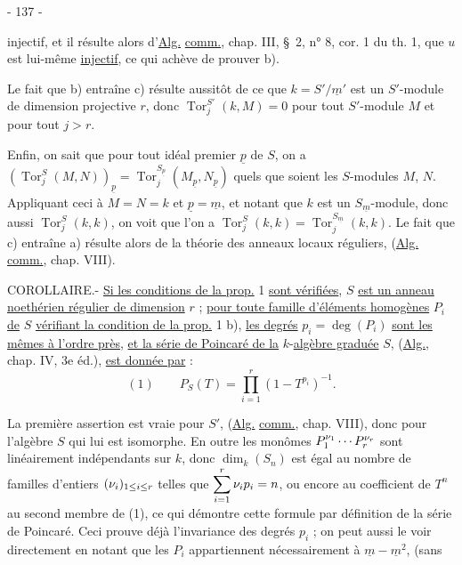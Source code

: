 \begin{center}- 137 -\end{center}

injectif, et il résulte alors d'\uline{Alg.} \uline{comm.}, chap. III, \S\ 2, n° 8, cor. 1 du th. 1, que $u$ est lui-même \uline{injectif}, ce qui achève de prouver b).

Le fait que b) entraîne c) résulte aussitôt de ce que $k=S'/\underline m'$ est un $S'$-module de dimension projective $r$, donc $\operatorname{Tor}^{S'}_j(k,M)=0$ pour tout $S'$-module $M$ et pour tout $j>r$.

Enfin, on sait que pour tout idéal premier $\underline p$ de $S$, on a $(\operatorname{Tor}^S_j(M,N))_{\underline p}=\operatorname{Tor}^{S_{\underline p}}_j(M_{\underline p},N_{\underline p})$ quels que soient les $S$-modules $M$, $N$. Appliquant ceci à $M=N=k$ et $\underline p=\underline m$, et notant que $k$ est un $S_{\underline m}$-module, donc aussi $\operatorname{Tor}^S_j(k,k)$, on voit que l'on a $\operatorname{Tor}^S_j(k,k)=\operatorname{Tor}^{S_{\underline m}}_j(k,k)$. Le fait que c) entraîne a) résulte alors de la théorie des anneaux locaux réguliers, (\uline{Alg.} \uline{comm.}, chap. VIII).

COROLLAIRE.- \uline{Si les conditions de la prop.} 1 \uline{sont vérifiées}, $S$ \uline{est un anneau noethérien régulier de dimension} $r$ ; \uline{pour toute famille d'éléments homogènes} $P_i$ \uline{de} $S$ \uline{vérifiant la condition de la prop.} 1 b), \uline{les degrés} $p_i=\deg(P_i)$ \uline{sont les mêmes à l'ordre près}, \uline{et la série de Poincaré de la} $k$-\uline{algèbre graduée} $S$, (\uline{Alg.}, chap. IV, 3e éd.), \uline{est donnée par} :
\[
(1)\qquad P_S(T)=\prod_{i=1}^r(1-T^{p_i})^{-1}.
\]

La première assertion est vraie pour $S'$, (\uline{Alg.} \uline{comm.}, chap. VIII), donc pour l'algèbre $S$ qui lui est isomorphe. En outre les monômes $P_1^{\relax{\nu_1}}\cdots P_r^{\relax{\nu_r}}$ sont linéairement indépendants sur $k$, donc $\dim_k(S_n)$ est égal au nombre de familles d'entiers $(\relax{\nu_i})_{1\leq i\leq r}$ telles que $\displaystyle\sum_{i=1}^r\relax{\nu_i}p_i=n$, ou encore au coefficient de $T^n$ au second membre de (1), ce qui démontre cette formule par définition de la série de Poincaré. Ceci prouve déjà l'invariance des degrés $p_i$ ; on peut aussi le voir directement en notant que les $P_i$ appartiennent nécessairement à $\underline m-\underline m^2$, (sans
